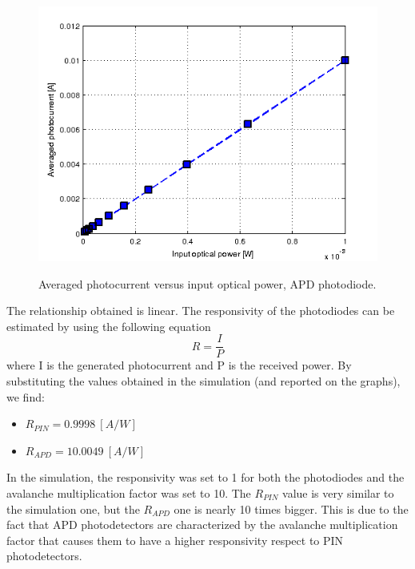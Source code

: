 \documentclass[a4paper,10pt]{report}
\begin{document}
\begin{figure}[!ht]
  \centering
  \includegraphics[width=12cm]{9_apd.png}\\
  \caption{Averaged photocurrent versus input optical power, APD photodiode.}
  \label{9_apd}
\end{figure}

The relationship obtained is linear.
The responsivity of the photodiodes can be estimated by using the following equation $$R=\frac{I}{P}$$
where I is the generated photocurrent and P is the received power. By substituting the values obtained in the simulation (and reported on the graphs),
we find:
\begin{itemize}
  \item $R_{PIN}=0.9998 \ [A/W]$
  \item $R_{APD}=10.0049 \ [A/W]$
\end{itemize}

In the simulation, the responsivity was set to 1 for both the photodiodes and the avalanche multiplication factor was set to 10.
The $R_{PIN}$ value is very similar to the simulation one, but the $R_{APD}$ one is nearly 10 times bigger.
This is due to the fact that APD photodetectors are characterized by the avalanche multiplication factor that causes them
to have a higher responsivity respect to PIN photodetectors.
\end{document}
